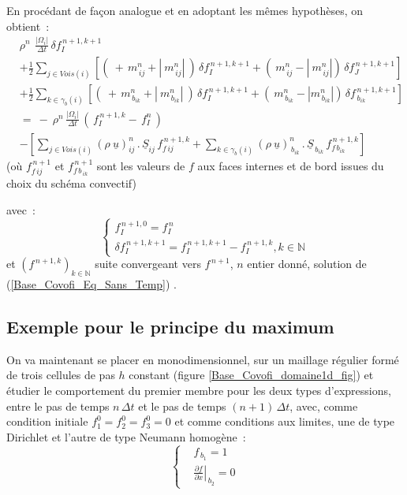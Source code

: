 En procédant de façon analogue et en adoptant les mêmes hypothèses, on
obtient~:
\begin{equation}
\begin{array}{lll}
&\rho^n\,\displaystyle\ \frac{|\Omega_i|}{\Delta
t}\,\delta f_I^{\,n+1,k+1}\\
& +\displaystyle\frac{1}{2}\sum\limits_{j\in Vois(i)}\left[(\
+\,m_{\,ij}^n + |\ m_{\,ij}^n|\ )\,\delta f_I^{\,n+1,k+1}+ (\ m_{\,ij}^n - |\
m_{\,ij}^n|)\,\delta f_J^{\,n+1,k+1}\right]\\
&+\displaystyle\frac{1}{2}\sum\limits_{k\in {\gamma_b(i)}}\left[(\ +\,
m_{\,{b}_{ik}}^n + |\ m_{\,{b}_{ik}}^n|\ )\,\delta f_I^{\,n+1,k+1} + (\
m_{\,{b}_{ik}}^n - |m_{\,{b}_{ik}}^n|)\,\delta
f_{\,{b}_{ik}}^{\,n+1,k+1}\right]\\
& =\ -\ \displaystyle \rho^n \,\frac {|\Omega_i| }{\Delta t}\,(\,f_I^{\,n+1,k}
-\,f_I^n\,)\\
& - \left[\sum\limits_{j\in Vois(i)} (\rho\
\underline{u})^{n}_{ij}\,.\,\underline{S}_{ij}\,
f^{\,n+1,k}_{f\,ij}+\sum\limits_{k\in {\gamma_b(i)}} (\rho\
\underline{u})^{n}_{\,b_{ik}}\,.\,\underline{S}_{\,b_{ik}}\,f^{\,n+1,k}_{f\,{b_{ik}}}\right]
\end{array}
\end{equation}
(où $f^{\,n+1}_{f\,ij}$ et $f^{\,n+1}_{f\,{b_{\,ik}}}$ sont les valeurs de $f$
aux faces internes et de bord issues du choix du schéma convectif)

avec~:
\begin{equation}
\left\{\begin{array}{ll}
f_I^{\,n+1,0} = f_I^{\,n}\\
\delta f_I^{\,n+1,k+1} = f_I^{\,n+1,k+1} - f_I^{\,n+1,k},{\text {$k\in \mathbb{N}$}}
\end{array}\right.
\end{equation}
et $(f^{\,n+1,k})_{k\in \mathbb{N}}$ suite convergeant vers  $f^{\,n+1}$, $n$
entier donné, solution de (\ref{Base_Covofi_Eq_Sans_Temp}) .\\

\subsection*{Exemple pour le principe du maximum}

On va maintenant se placer en monodimensionnel, sur un maillage régulier
formé de trois cellules de pas $h$ constant (figure \ref{Base_Covofi_domaine1d_fig}) et étudier le comportement
du premier membre pour les deux types d'expressions, entre le pas de temps
 $n\,\Delta t$ et le pas de temps $(n+1)\,\Delta t$, avec, comme condition
initiale $f_1^0 = f_2^0 =f_3^0 = 0$ et comme conditions aux limites, une de type
Dirichlet et l'autre de type Neumann homogène~:
\begin{equation}
\left\{\begin{array}{ll}
&f_{\,b_1} = 1 \\
&\displaystyle \left.\frac{\partial f}{\partial x} \right|_{\,b_2} = 0
\end{array}\right.
\end{equation}

